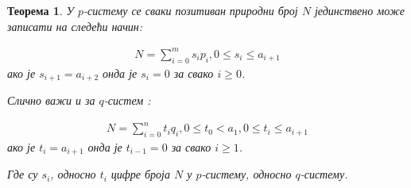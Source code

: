 \documentclass[a4paper]{article}
\newtheorem{theorem}{Теорема}
\begin{document}
\begin{theorem}
	\label{thm:p_q_sistemi}
	У $ p $-систему се сваки позитиван природни број $ N $ јединствено може записати на следећи начин:
	
	\begin{eqnarray}
		\label{p_sistem} N = \sum_{i=0}^{m} s_{i}p_{i}, 0 \le s_{i} \le a_{i+1}
	\end{eqnarray}
	ако је $ s_{i+1} = a_{i+2} $ онда је $ s_{i} = 0  $ за свако $ i \ge 0 $.
	
	Слично важи и за $ q $-систем :
	
	\begin{eqnarray}
		\label{q_sistem} N = \sum_{i=0}^{n} t_{i}q_{i}, 0 \le t_{0} < a_{1}, 0 \le t_{i} \le a_{i+1}
	\end{eqnarray}
	ако је $ t_{i} = a_{i+1} $ онда је $ t_{i-1} = 0 $ за свако $ i \ge 1 $.
	
	Где су $ s_{i} $, односно $ t_{i} $ цифре броја $ N $  у $ p $-систему, односно $ q $-систему.
\end{theorem} 
\end{document}
